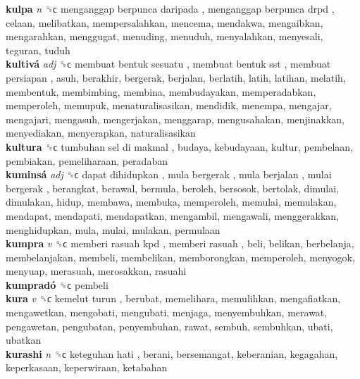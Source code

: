 \textbf{kulpa} \emph{n}  ␝ϲ   menganggap berpunca daripada ,  menganggap berpunca drpd , celaan, melibatkan, mempersalahkan, mencema, mendakwa, mengaibkan, mengarahkan, menggugat, menuding, menuduh, menyalahkan, menyesali, teguran, tuduh  \\
\textbf{kultivá} \emph{adj}  ␝ϲ   membuat bentuk sesuatu ,  membuat bentuk sst ,  membuat persiapan , asuh, berakhir, bergerak, berjalan, berlatih, latih, latihan, melatih, membentuk, membimbing, membina, membudayakan, memperadabkan, memperoleh, memupuk, menaturalisasikan, mendidik, menempa, mengajar, mengajari, mengasuh, mengerjakan, menggarap, mengusahakan, menjinakkan, menyediakan, menyerapkan, naturalisasikan  \\
\textbf{kultura} ␝ϲ   tumbuhan sel di makmal , budaya, kebudayaan, kultur, pembelaan, pembiakan, pemeliharaan, peradaban  \\
\textbf{kuminsá} \emph{adj}  ␝ϲ   dapat dihidupkan ,  mula bergerak ,  mula berjalan ,  mulai bergerak , berangkat, berawal, bermula, beroleh, bersosok, bertolak, dimulai, dimulakan, hidup, membawa, membuka, memperoleh, memulai, memulakan, mendapat, mendapati, mendapatkan, mengambil, mengawali, menggerakkan, menghidupkan, mula, mulai, mulakan, permulaan  \\
\textbf{kumpra} \emph{v}  ␝ϲ   memberi rasuah kpd ,  memberi rasuah , beli, belikan, berbelanja, membelanjakan, membeli, membelikan, memborongkan, memperoleh, menyogok, menyuap, merasuah, merosakkan, rasuahi  \\
\textbf{kumpradó} ␝ϲ  pembeli  \\
\textbf{kura} \emph{v}  ␝ϲ   kemelut turun , berubat, memelihara, memulihkan, mengafiatkan, mengawetkan, mengobati, mengubati, menjaga, menyembuhkan, merawat, pengawetan, pengubatan, penyembuhan, rawat, sembuh, sembuhkan, ubati, ubatkan  \\
\textbf{kurashi} \emph{n}  ␝ϲ   keteguhan hati , berani, bersemangat, keberanian, kegagahan, keperkasaan, keperwiraan, ketabahan  \\
